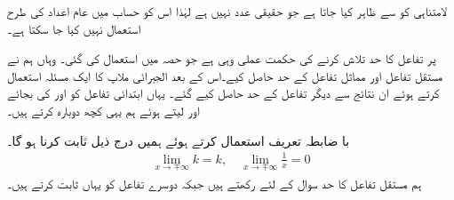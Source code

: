 لامتناہی کو  سے ظاہر کیا جاتا ہے جو حقیقی عدد نہیں ہے لہٰذا اس کو حساب میں عام اعداد کی طرح استعمال نہیں کیا جا سکتا ہے۔ 

 پر تفاعل کا حد تلاش کرنے کی حکمت عملی وہی ہے جو حصہ  میں استعمال کی گئی۔ وہاں ہم نے مستقل تفاعل  اور مماثل تفاعل  کے حد حاصل کیے۔اس کے بعد الجبرائی ملاپ کا ایک مسئلہ استعمال کرتے ہوئے ان نتائج سے دیگر تفاعل کے حد حاصل کیے گئے۔ یہاں ابتدائی تفاعل کو  اور  کی بجائے  اور  لیتے ہوئے ہم یہی کچھ دوبارہ کرتے ہیں۔ 

با ضابطہ  تعریف استعمال کرتے ہوئے ہمیں درج ذیل ثابت کرنا ہو گا۔
\begin{align}\label{مساوات_استعمال_معکوس_حد}
\lim_{x\to \mp \infty} k=k,\quad \lim_{x\to \mp \infty}\frac{1}{x}=0
\end{align}
ہم مستقل تفاعل کا حد سوال کے لئے  رکھتے ہیں جبکہ دوسرے تفاعل کو یہاں ثابت کرتے ہیں۔

